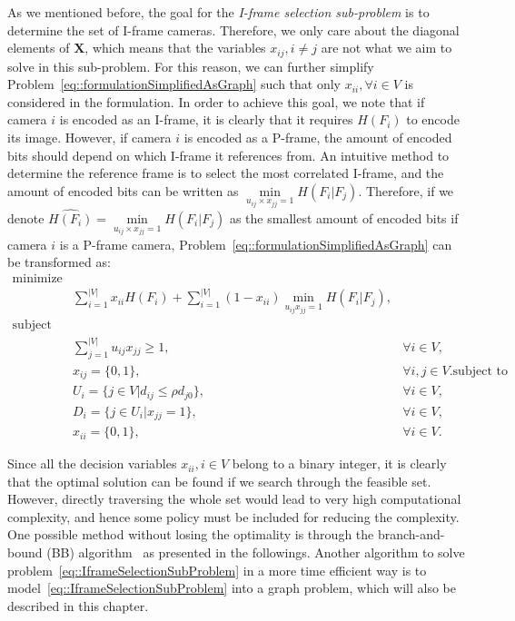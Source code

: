 As we mentioned before, the goal for the \emph{I-frame selection sub-problem} is to determine the set of I-frame cameras.
Therefore, we only care about the diagonal elements of $\mathbf{X}$, which means that the variables $x_{ij}, i \neq j$ are not what we aim to solve in this sub-problem.
For this reason, we can further simplify Problem~\eqref{eq::formulationSimplifiedAsGraph} such that only $x_{ii}, \forall i \in V$ is considered in the formulation.
In order to achieve this goal, we note that if camera $i$ is encoded as an I-frame, it is clearly that it requires $H(F_i)$ to encode its image.
However, if camera $i$ is encoded as a P-frame, the amount of encoded bits should depend on which I-frame it references from.
An intuitive method to determine the reference frame is to select the most correlated I-frame, and the amount of encoded bits can be written as $\underset{u_{ij} \times x_{jj} = 1}{\min} H(F_i|F_j)$.
Therefore, if we denote ${\hat{H(F_i)} = \underset{u_{ij} \times x_{jj} = 1}{\min} H(F_i|F_j)}$ as the smallest amount of encoded bits if camera $i$ is a P-frame camera, Problem~\eqref{eq::formulationSimplifiedAsGraph} can be transformed as:
\begin{align}
\text{minimize} & & \nonumber \\
	&\sum_{i=1}^{|V|} x_{ii}H(F_i) + \sum_{i=1}^{|V|} (1-x_{ii}) \underset{u_{ij} x_{jj} = 1}{\min} H(F_i|F_j), & \nonumber \\
\text{subject to} & & \nonumber \\
	&\sum_{j=1}^{|V|} u_{ij} x_{jj} \geq 1, &\forall i \in V, \nonumber \\
	&x_{ij} = \{0,1\}, &\forall i,j \in V. 
\text{subject to} & & \nonumber \\
	&U_i = \{ j \in V | d_{ij} \leq \rho d_{j0} \}, &\forall i \in V, \nonumber \\
	&D_i = \{ j \in U_i| x_{jj} = 1\}, &\forall i \in V, \nonumber \\
	&x_{ii} = \{0,1\}, &\forall i \in V.
\label{eq::IframeSelectionSubProblem}
\end{align}

Since all the decision variables ${x_{ii},i \in V}$ belong to a binary integer, it is clearly that the optimal solution can be found if we search through the feasible set.
However, directly traversing the whole set would lead to very high computational complexity, and hence some policy must be included for reducing the complexity.
One possible method without losing the optimality is through the branch-and-bound (BB) algorithm~\cite{BB} as presented in the followings.
Another algorithm to solve problem~\eqref{eq::IframeSelectionSubProblem} in a more time efficient way is to model~\eqref{eq::IframeSelectionSubProblem} into a graph problem, which will also be described in this chapter.
%
